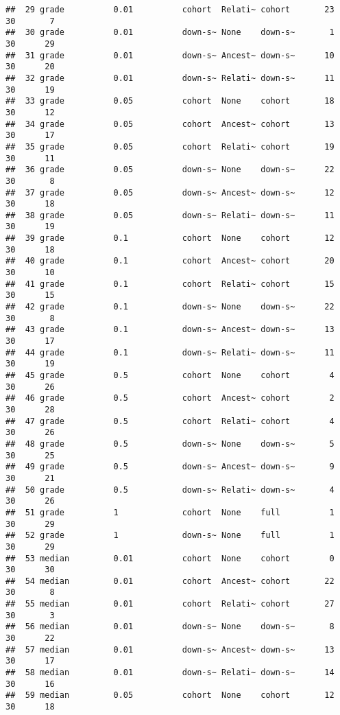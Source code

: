 \documentclass[
]{book}
\begin{document}
\begin{verbatim}
##  29 grade          0.01          cohort  Relati~ cohort       23      30       7
##  30 grade          0.01          down-s~ None    down-s~       1      30      29
##  31 grade          0.01          down-s~ Ancest~ down-s~      10      30      20
##  32 grade          0.01          down-s~ Relati~ down-s~      11      30      19
##  33 grade          0.05          cohort  None    cohort       18      30      12
##  34 grade          0.05          cohort  Ancest~ cohort       13      30      17
##  35 grade          0.05          cohort  Relati~ cohort       19      30      11
##  36 grade          0.05          down-s~ None    down-s~      22      30       8
##  37 grade          0.05          down-s~ Ancest~ down-s~      12      30      18
##  38 grade          0.05          down-s~ Relati~ down-s~      11      30      19
##  39 grade          0.1           cohort  None    cohort       12      30      18
##  40 grade          0.1           cohort  Ancest~ cohort       20      30      10
##  41 grade          0.1           cohort  Relati~ cohort       15      30      15
##  42 grade          0.1           down-s~ None    down-s~      22      30       8
##  43 grade          0.1           down-s~ Ancest~ down-s~      13      30      17
##  44 grade          0.1           down-s~ Relati~ down-s~      11      30      19
##  45 grade          0.5           cohort  None    cohort        4      30      26
##  46 grade          0.5           cohort  Ancest~ cohort        2      30      28
##  47 grade          0.5           cohort  Relati~ cohort        4      30      26
##  48 grade          0.5           down-s~ None    down-s~       5      30      25
##  49 grade          0.5           down-s~ Ancest~ down-s~       9      30      21
##  50 grade          0.5           down-s~ Relati~ down-s~       4      30      26
##  51 grade          1             cohort  None    full          1      30      29
##  52 grade          1             down-s~ None    full          1      30      29
##  53 median         0.01          cohort  None    cohort        0      30      30
##  54 median         0.01          cohort  Ancest~ cohort       22      30       8
##  55 median         0.01          cohort  Relati~ cohort       27      30       3
##  56 median         0.01          down-s~ None    down-s~       8      30      22
##  57 median         0.01          down-s~ Ancest~ down-s~      13      30      17
##  58 median         0.01          down-s~ Relati~ down-s~      14      30      16
##  59 median         0.05          cohort  None    cohort       12      30      18

\end{verbatim}
\end{document}
